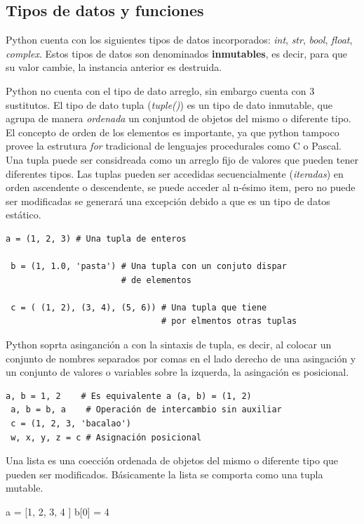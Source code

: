 \documentclass[a4paper]{report}
\begin{document}
\subsection{Tipos de datos y funciones}
Python cuenta con los siguientes tipos de datos incorporados: 
\emph{int}, 
\emph{str}, 
\emph{bool}, 
\emph{float}, 
\emph{complex}. Estos
tipos de datos son denominados \textbf{inmutables}, es decir, para que su valor cambie, la instancia anterior
es destruida. 

Python no cuenta con el tipo de dato arreglo, sin embargo cuenta con 3 sustitutos. 
El tipo de dato tupla (\emph{tuple()}) es un tipo de dato inmutable, que agrupa 
de manera \emph{ordenada} un conjuntod de objetos del mismo o diferente
tipo. El concepto de orden de los elementos es importante, ya que python tampoco provee la estrutura \emph{for} tradicional
de lenguajes procedurales como C o Pascal. %
Una tupla puede ser considreada como un arreglo fijo de valores que pueden
tener diferentes tipos. Las tuplas pueden ser accedidas secuencialmente (\emph{iteradas}) en orden ascendente o descendente, se puede 
acceder al n-ésimo item, pero no puede ser modificadas se generará una excepción debido 
a que es un tipo de datos estático.

\begin{lstlisting}[label=tuplas-python,caption=Tuplas en Python]
 a = (1, 2, 3) # Una tupla de enteros

 b = (1, 1.0, 'pasta') # Una tupla con un conjuto dispar 
                       # de elementos

 c = ( (1, 2), (3, 4), (5, 6)) # Una tupla que tiene 
                               # por elmentos otras tuplas
\end{lstlisting}

Python soprta asinganción a con la sintaxis de tupla, es decir, al colocar un conjunto de nombres 
separados por comas en el lado derecho de una asingación y un conjunto de valores o variables
sobre la izquerda, la asingación es posicional.
\begin{lstlisting}[label=asignacion-python,caption=Asignacion en Python]
 a, b = 1, 2	# Es equivalente a (a, b) = (1, 2)
 a, b = b, a	# Operación de intercambio sin auxiliar
 c = (1, 2, 3, 'bacalao')
 w, x, y, z = c	# Asignación posicional
\end{lstlisting}


Una lista es una coección ordenada de objetos del mismo o diferente tipo que pueden 
ser modificados. Básicamente la lista se comporta como una tupla mutable.
\begin{python}
 a = [1, 2, 3, 4 ]
 b[0] = 4
\end{python}
\end{document}
